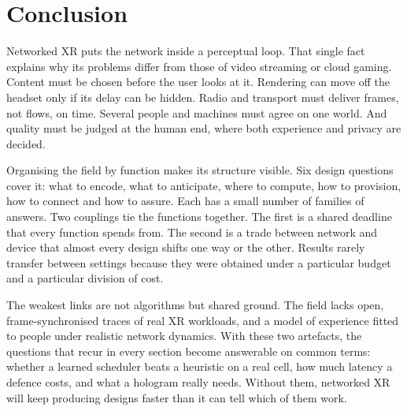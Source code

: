 \section{Conclusion}\label{sec:conclusion}

Networked XR puts the network inside a perceptual loop. That single fact explains why its problems
differ from those of video streaming or cloud gaming. Content must be chosen before the user looks at
it. Rendering can move off the headset only if its delay can be hidden. Radio and transport must deliver
frames, not flows, on time. Several people and machines must agree on one world. And quality must be
judged at the human end, where both experience and privacy are decided.

Organising the field by function makes its structure visible. Six design questions cover it: what to
encode, what to anticipate, where to compute, how to provision, how to connect and how to assure. Each
has a small number of families of answers. Two couplings tie the functions together. The first is a
shared deadline that every function spends from. The second is a trade between network and device that
almost every design shifts one way or the other. Results rarely transfer between settings because they
were obtained under a particular budget and a particular division of cost.

The weakest links are not algorithms but shared ground. The field lacks open, frame-synchronised traces
of real XR workloads, and a model of experience fitted to people under realistic network dynamics. With
these two artefacts, the questions that recur in every section become answerable on common terms: whether
a learned scheduler beats a heuristic on a real cell, how much latency a defence costs, and what a
hologram really needs. Without them, networked XR will keep producing designs faster than it can tell
which of them work.
